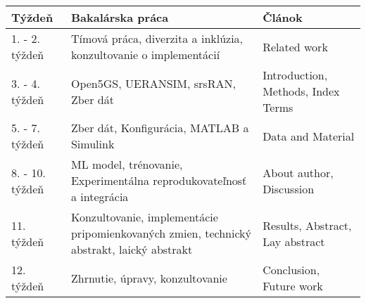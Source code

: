 \begin{tabular}{|p{2.8cm}||p{6.2cm}||p{4.2cm}|}
\hline
Týždeň & Bakalárska práca & Článok \\
\hline
1. - 2. týždeň & Tímová práca, diverzita a inklúzia, konzultovanie o implementácií & Related work  \\
\hline
3. - 4. týždeň & Open5GS, UERANSIM, srsRAN, Zber dát & Introduction, Methods, Index Terms \\
\hline
5. - 7.  týždeň  & Zber dát, Konfigurácia, MATLAB a Simulink & Data and Material  \\
\hline
8. - 10. týždeň & ML model, trénovanie, Experimentálna reprodukovateľnosť a integrácia & About author, Discussion  \\
\hline
11. týždeň & Konzultovanie, implementácie pripomienkovaných zmien, technický abstrakt, laický abstrakt & Results, Abstract, Lay abstract  \\
\hline
12. týždeň &  Zhrnutie, úpravy, konzultovanie & Conclusion, Future work \\
\hline
\end{tabular}
